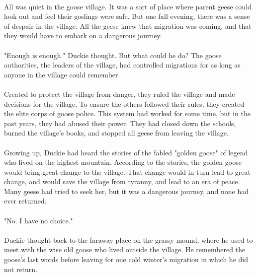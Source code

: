 \documentclass[a4paper,10pt,standalone]{book}
\begin{document}
\tableofcontents
\vfill
\pagebreak
\paragraph{} All was quiet in the goose village. It was a sort of place where parent geese could look out and feel their goslings were safe. But one fall evening, there was a sense of despair in the village. All the geese knew that migration was coming, and that they would have to embark on a dangerous journey. 
\paragraph{} "Enough is enough." Duckie thought. But what could he do? The goose authorities, the leaders of the village, had controlled migrations for as long as anyone in the village could remember. 
\paragraph{} Created to protect the village from danger, they ruled the village and made decisions for the village. To ensure the others followed their rules, they created the elite corps of goose police. This system had worked for some time, but in the past years, they had abused their power. They had closed down the schools, burned the village's books, and stopped all geese from leaving the village.
\paragraph{} Growing up, Duckie had heard the stories of the fabled "golden goose" of legend who lived on the highest mountain. According to the stories, the golden goose would bring great change to the village. That change would in turn lead to great change, and would save the village from tyranny, and lead to an era of peace. Many geese had tried to seek her, but it was a dangerous journey, and none had ever returned. 
\paragraph{} "No. I have no choice." 
\paragraph{} Duckie thought back to the faraway place on the grassy mound, where he used to meet with the wise old goose who lived outside the village. He remembered the goose's last words before leaving for one cold winter's migration in which he did not return.
\end{document}
